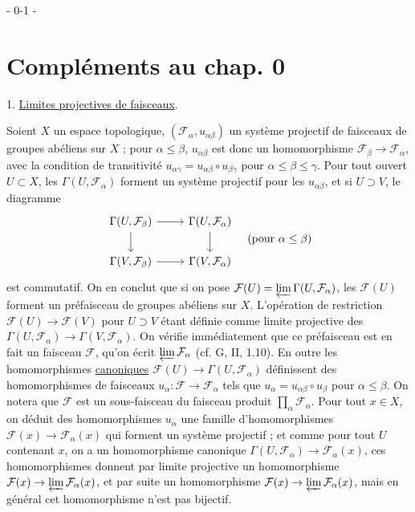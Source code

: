 
- 0-1 -

\section*{Compléments au chap. 0}

1. \underline{Limites projectives de faisceaux}.

Soient $X$ un espace topologique, $(\mathcal{F}_\alpha, u_{\alpha\beta})$ un système projectif de faisceaux de groupes abéliens sur $X$ ; pour $\alpha \le \beta$, $u_{\alpha\beta}$ est donc un homomorphisme $\mathcal{F}_\beta \to \mathcal{F}_\alpha$, avec la condition de transitivité $u_{\alpha\gamma} = u_{\alpha\beta} \circ u_{\beta\gamma}$ pour $\alpha \le \beta \le \gamma$. Pour tout ouvert $U \subset X$, les $\Gamma(U, \mathcal{F}_\alpha)$ forment un système projectif pour les $u_{\alpha\beta}$, et si $U \supset V$, le diagramme
$$
\begin{tikzcd}
\Gamma(U, \mathcal{F}_\beta) \arrow[d] \arrow[r] & \Gamma(U, \mathcal{F}_\alpha) \arrow[d] \\
\Gamma(V, \mathcal{F}_\beta) \arrow[r] & \Gamma(V, \mathcal{F}_\alpha)
\end{tikzcd}
\quad (\text{pour } \alpha \le \beta)
$$
est commutatif. On en conclut que si on pose $\mathcal{F}(U) = \varprojlim \Gamma(U, \mathcal{F}_\alpha)$, les $\mathcal{F}(U)$ forment un préfaisceau de groupes abéliens sur $X$. L'opération de restriction $\mathcal{F}(U) \to \mathcal{F}(V)$ pour $U \supset V$ étant définie comme limite projective des $\Gamma(U, \mathcal{F}_\alpha) \to \Gamma(V, \mathcal{F}_\alpha)$. On vérifie immédiatement que ce préfaisceau est en fait un faisceau $\mathcal{F}$, qu'on écrit $\varprojlim \mathcal{F}_\alpha$ (cf. G, II, 1.10). En outre les homomorphismes \underline{canoniques} $\mathcal{F}(U) \to \Gamma(U, \mathcal{F}_\alpha)$ définissent des homomorphismes de faisceaux $u_\alpha : \mathcal{F} \to \mathcal{F}_\alpha$ tels que $u_\alpha = u_{\alpha\beta} \circ u_\beta$ pour $\alpha \le \beta$. On notera que $\mathcal{F}$ est un sous-faisceau du faisceau produit $\prod_\alpha \mathcal{F}_\alpha$. Pour tout $x \in X$, on déduit des homomorphismes $u_\alpha$ une famille d'homomorphismes $\mathcal{F}(x) \to \mathcal{F}_\alpha(x)$ qui forment un système projectif ; et comme pour tout $U$ contenant $x$, on a un homomorphisme canonique $\Gamma(U, \mathcal{F}_\alpha) \to \mathcal{F}_\alpha(x)$, ces homomorphismes donnent par limite projective un homomorphisme $\mathcal{F}(x) \to \varprojlim \mathcal{F}_\alpha(x)$, et par suite un homomorphisme $\mathcal{F}(x) \to \varprojlim \mathcal{F}_\alpha(x)$, mais en général cet homomorphisme n'est pas bijectif.

